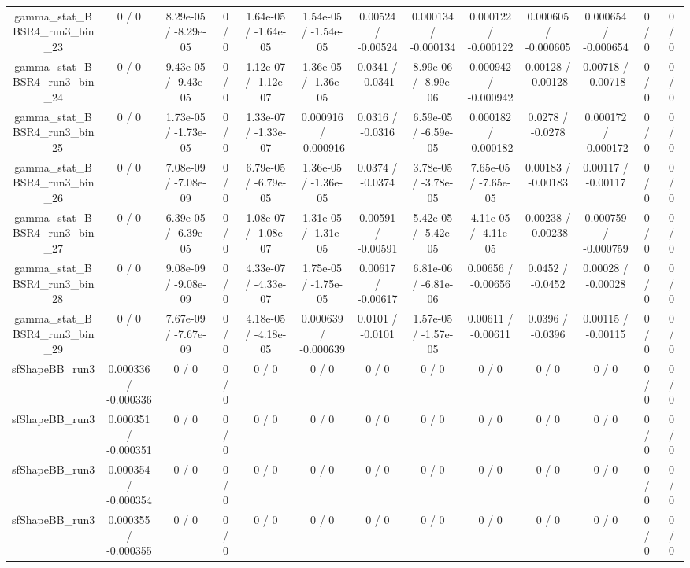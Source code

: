 \documentclass[10pt]{article}
\begin{document}
\begin{table}[htbp]
\begin{center}
\begin{tabular}{|c|c|c|c|c|c|c|c|c|c|c|c|c|}
  gamma_stat_BBSR4_run3_bin_23 & 0 / 0 & 8.29e-05 / -8.29e-05 & 0 / 0 & 1.64e-05 / -1.64e-05 & 1.54e-05 / -1.54e-05 & 0.00524 / -0.00524 & 0.000134 / -0.000134 & 0.000122 / -0.000122 & 0.000605 / -0.000605 & 0.000654 / -0.000654 & 0 / 0 & 0 / 0 \\ 
  gamma_stat_BBSR4_run3_bin_24 & 0 / 0 & 9.43e-05 / -9.43e-05 & 0 / 0 & 1.12e-07 / -1.12e-07 & 1.36e-05 / -1.36e-05 & 0.0341 / -0.0341 & 8.99e-06 / -8.99e-06 & 0.000942 / -0.000942 & 0.00128 / -0.00128 & 0.00718 / -0.00718 & 0 / 0 & 0 / 0 \\ 
  gamma_stat_BBSR4_run3_bin_25 & 0 / 0 & 1.73e-05 / -1.73e-05 & 0 / 0 & 1.33e-07 / -1.33e-07 & 0.000916 / -0.000916 & 0.0316 / -0.0316 & 6.59e-05 / -6.59e-05 & 0.000182 / -0.000182 & 0.0278 / -0.0278 & 0.000172 / -0.000172 & 0 / 0 & 0 / 0 \\ 
  gamma_stat_BBSR4_run3_bin_26 & 0 / 0 & 7.08e-09 / -7.08e-09 & 0 / 0 & 6.79e-05 / -6.79e-05 & 1.36e-05 / -1.36e-05 & 0.0374 / -0.0374 & 3.78e-05 / -3.78e-05 & 7.65e-05 / -7.65e-05 & 0.00183 / -0.00183 & 0.00117 / -0.00117 & 0 / 0 & 0 / 0 \\ 
  gamma_stat_BBSR4_run3_bin_27 & 0 / 0 & 6.39e-05 / -6.39e-05 & 0 / 0 & 1.08e-07 / -1.08e-07 & 1.31e-05 / -1.31e-05 & 0.00591 / -0.00591 & 5.42e-05 / -5.42e-05 & 4.11e-05 / -4.11e-05 & 0.00238 / -0.00238 & 0.000759 / -0.000759 & 0 / 0 & 0 / 0 \\ 
  gamma_stat_BBSR4_run3_bin_28 & 0 / 0 & 9.08e-09 / -9.08e-09 & 0 / 0 & 4.33e-07 / -4.33e-07 & 1.75e-05 / -1.75e-05 & 0.00617 / -0.00617 & 6.81e-06 / -6.81e-06 & 0.00656 / -0.00656 & 0.0452 / -0.0452 & 0.00028 / -0.00028 & 0 / 0 & 0 / 0 \\ 
  gamma_stat_BBSR4_run3_bin_29 & 0 / 0 & 7.67e-09 / -7.67e-09 & 0 / 0 & 4.18e-05 / -4.18e-05 & 0.000639 / -0.000639 & 0.0101 / -0.0101 & 1.57e-05 / -1.57e-05 & 0.00611 / -0.00611 & 0.0396 / -0.0396 & 0.00115 / -0.00115 & 0 / 0 & 0 / 0 \\ 
  sfShapeBB_run3 & 0.000336 / -0.000336 & 0 / 0 & 0 / 0 & 0 / 0 & 0 / 0 & 0 / 0 & 0 / 0 & 0 / 0 & 0 / 0 & 0 / 0 & 0 / 0 & 0 / 0 \\ 
  sfShapeBB_run3 & 0.000351 / -0.000351 & 0 / 0 & 0 / 0 & 0 / 0 & 0 / 0 & 0 / 0 & 0 / 0 & 0 / 0 & 0 / 0 & 0 / 0 & 0 / 0 & 0 / 0 \\ 
  sfShapeBB_run3 & 0.000354 / -0.000354 & 0 / 0 & 0 / 0 & 0 / 0 & 0 / 0 & 0 / 0 & 0 / 0 & 0 / 0 & 0 / 0 & 0 / 0 & 0 / 0 & 0 / 0 \\ 
  sfShapeBB_run3 & 0.000355 / -0.000355 & 0 / 0 & 0 / 0 & 0 / 0 & 0 / 0 & 0 / 0 & 0 / 0 & 0 / 0 & 0 / 0 & 0 / 0 & 0 / 0 & 0 / 0 \\ 

\end{tabular}
\end{center}
\end{table}
\end{document}
